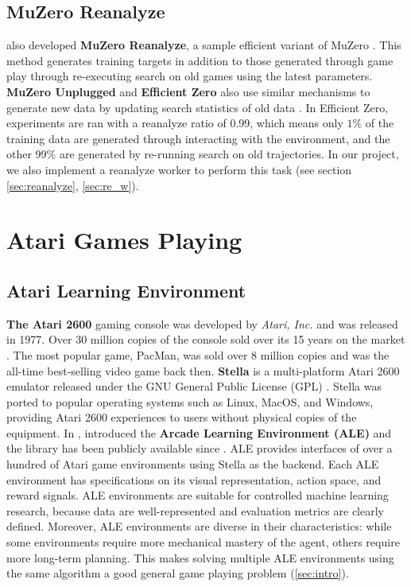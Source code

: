 \subsection{MuZero Reanalyze} \label{sec:muzero_reanalyze}
\citeauthor{MasteringAtariGo_Schrittwieser.Antonoglou.ea_2020} also developed \textbf{MuZero Reanalyze}, a sample efficient variant of MuZero \cite{MasteringAtariGo_Schrittwieser.Antonoglou.ea_2020}.
This method generates training targets in addition to those generated through game play through re-executing search on old games using the latest parameters.
\textbf{MuZero Unplugged} and \textbf{Efficient Zero} also use similar mechanisms to generate new data by updating search statistics of old data \cite{OnlineOfflineReinforcement_Schrittwieser.Hubert.ea_2021b,MasteringAtariGames_Ye.Liu.ea_2021}.
In Efficient Zero, experiments are ran with a reanalyze ratio of 0.99, which means only $1\%$ of the training data are generated through interacting with the environment, and the other 99\% are generated by re-running search on old trajectories.
In our project, we also implement a reanalyze worker to perform this task (see section \ref{sec:reanalyze}, \ref{sec:re_w}).

\section{Atari Games Playing}
\subsection{Atari Learning Environment} \label{sec:ale}
\textbf{The Atari 2600} gaming console was developed by \textit{Atari, Inc.} and was released in 1977.
Over 30 million copies of the console sold over its 15 years on the market \cite{Atari2600__2022}.
The most popular game, PacMan, was sold over 8 million copies and was the all-time best-selling video game back then.
\textbf{Stella} is a multi-platform Atari 2600 emulator released under the GNU General Public License (GPL) \cite{StellaMultiPlatformAtari__}.
Stella was ported to popular operating systems such as Linux, MacOS, and Windows, providing Atari 2600 experiences to users without physical copies of the equipment.
In \citeyear{ArcadeLearningEnvironment_Bellemare.Naddaf.ea_2013a}, \citeauthor{ArcadeLearningEnvironment_Bellemare.Naddaf.ea_2013a} introduced the \textbf{Arcade Learning Environment (ALE)} and the library has been publicly available since \cite{ArcadeLearningEnvironment_Bellemare.Naddaf.ea_2013a}.
ALE provides interfaces of over a hundred of Atari game environments using Stella as the backend.
Each ALE environment has specifications on its visual representation, action space, and reward signals.
ALE environments are suitable for controlled machine learning research,
because data are well-represented and evaluation metrics are clearly defined.
Moreover, ALE environments are diverse in their characteristics: while some environments require more mechanical mastery of the agent, others require more long-term planning.
This makes solving multiple ALE environments using the same algorithm a good general game playing problem (\ref{sec:intro}).

